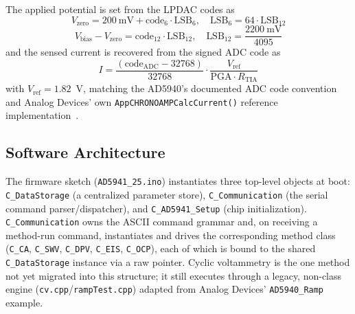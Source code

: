 \documentclass[journal]{IEEEtran}
\begin{document}
The applied potential is set from the LPDAC codes as
\begin{equation}
V_{\text{zero}} = 200~\text{mV} + \text{code}_{6} \cdot \text{LSB}_{6}, \quad \text{LSB}_{6} = 64\cdot\text{LSB}_{12}
\label{eq:vzero}
\end{equation}
\begin{equation}
V_{\text{bias}} - V_{\text{zero}} = \text{code}_{12} \cdot \text{LSB}_{12}, \quad \text{LSB}_{12} = \frac{2200~\text{mV}}{4095}
\label{eq:vbias}
\end{equation}
and the sensed current is recovered from the signed ADC code as
\begin{equation}
I = \frac{(\text{code}_{\text{ADC}} - 32768)}{32768}\cdot \frac{V_{\text{ref}}}{\text{PGA}\cdot R_{\text{TIA}}}
\label{eq:current}
\end{equation}
with $V_{\text{ref}} = 1.82$~V, matching the AD5940's documented ADC code convention and Analog Devices' own \texttt{AppCHRONOAMPCalcCurrent()} reference implementation~\cite{ref:ad5940examples}.

\subsection{Software Architecture}
The firmware sketch (\texttt{AD5941\_25.ino}) instantiates three top-level objects at boot: \texttt{C\_DataStorage} (a centralized parameter store), \texttt{C\_Communication} (the serial command parser/dispatcher), and \texttt{C\_AD5941\_Setup} (chip initialization). \texttt{C\_Communication} owns the ASCII command grammar and, on receiving a method-run command, instantiates and drives the corresponding method class (\texttt{C\_CA}, \texttt{C\_SWV}, \texttt{C\_DPV}, \texttt{C\_EIS}, \texttt{C\_OCP}), each of which is bound to the shared \texttt{C\_DataStorage} instance via a raw pointer. Cyclic voltammetry is the one method not yet migrated into this structure; it still executes through a legacy, non-class engine (\texttt{cv.cpp}/\texttt{rampTest.cpp}) adapted from Analog Devices' \texttt{AD5940\_Ramp} example.
\end{document}
